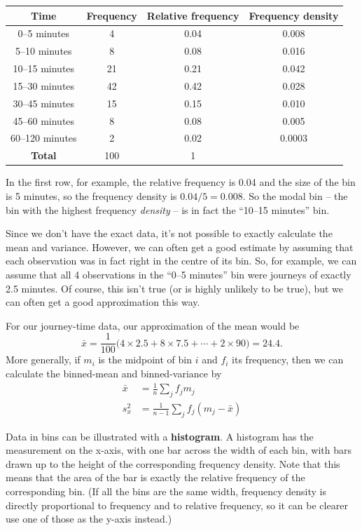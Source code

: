 \documentclass[
  a4paper,
]{book}
\theoremstyle{definition}
\theoremstyle{definition}
\theoremstyle{definition}
\theoremstyle{remark}
\begin{document}
\begin{longtable}[]{@{}cccc@{}}
\toprule
Time & Frequency & Relative frequency & Frequency density \\
\midrule
\endhead
0--5 minutes & 4 & 0.04 & 0.008 \\
5--10 minutes & 8 & 0.08 & 0.016 \\
10--15 minutes & 21 & 0.21 & 0.042 \\
15--30 minutes & 42 & 0.42 & 0.028 \\
30--45 minutes & 15 & 0.15 & 0.010 \\
45--60 minutes & 8 & 0.08 & 0.005 \\
60--120 minutes & 2 & 0.02 & 0.0003 \\
\textbf{Total} & 100 & 1 & \\
\bottomrule
\end{longtable}

In the first row, for example, the relative frequency is 0.04 and the size of the bin is 5 minutes, so the frequency density is \(0.04/5 = 0.008\). So the modal bin -- the bin with the highest frequency \emph{density} -- is in fact the ``10--15 minutes'' bin.

Since we don't have the exact data, it's not possible to exactly calculate the mean and variance. However, we can often get a good estimate by assuming that each observation was in fact right in the centre of its bin. So, for example, we can assume that all 4 observations in the ``0--5 minutes'' bin were journeys of exactly 2.5 minutes. Of course, this isn't true (or is highly unlikely to be true), but we can often get a good approximation this way.

For our journey-time data, our approximation of the mean would be
\[ \bar x = \frac{1}{100} \big(4\times 2.5 + 8 \times 7.5 + \cdots + 2\times90) = 24.4 . \]
More generally, if \(m_i\) is the midpoint of bin \(i\) and \(f_i\) its frequency, then we can calculate the binned-mean and binned-variance by
\begin{align*}
  \bar x &= \frac{1}{n} \sum_j f_j m_j \\
  s^2_x  &= \frac{1}{n-1} \sum_j f_j (m_j - \bar x)
\end{align*}

Data in bins can be illustrated with a \textbf{histogram}. A histogram has the measurement on the x-axis, with one bar across the width of each bin, with bars drawn up to the height of the corresponding frequency density. Note that this means that the area of the bar is exactly the relative frequency of the corresponding bin. (If all the bins are the same width, frequency density is directly proportional to frequency and to relative frequency, so it can be clearer use one of those as the y-axis instead.)
\end{document}
